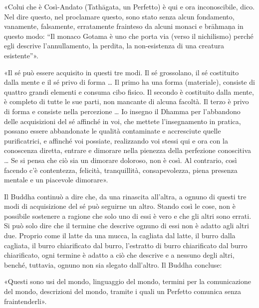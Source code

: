 
\label{pag226}%
«Colui che è Così-Andato (Tathāgata, un Perfetto)
è qui e ora inconoscibile, dico. Nel dire questo, nel proclamare questo, sono
stato senza alcun fondamento, vanamente, falsamente, erratamente frainteso da
alcuni monaci e brāhmaṇa in questo modo: “Il monaco Gotama è uno che porta via
(verso il nichilismo) perché egli descrive l’annullamento, la perdita, la
non-esistenza di una creatura esistente”».


«Il sé può essere acquisito in questi tre modi. Il sé grossolano, il sé
costituito dalla mente e il sé privo di forma … Il primo ha una forma
(materiale), consiste di quattro grandi elementi e consuma cibo fisico. Il
secondo è costituito dalla mente, è completo di tutte le sue parti, non mancante
di alcuna facoltà. Il terzo è privo di forma e consiste nella percezione … Io
insegno il Dhamma per l’abbandono delle acquisizioni del sé affinché in voi, che
mettete l’insegnamento in pratica, possano essere abbandonate le qualità
contaminate e accresciute quelle purificatrici, e affinché voi possiate,
realizzando voi stessi qui e ora con la conoscenza diretta, entrare e dimorare
nella pienezza della perfezione conoscitiva … Se si pensa che ciò sia un
dimorare doloroso, non è così. Al contrario, così facendo c’è contentezza,
felicità, tranquillità, consapevolezza, piena presenza mentale e un piacevole
dimorare».

 Il Buddha continuò a dire che, da una rinascita
all’altra, a ognuno di questi tre modi di acquisizione del sé può seguirne un
altro. Stando così le cose, non è possibile sostenere a ragione che solo uno di
essi è vero e che gli altri sono errati. Si può solo dire che il termine che
descrive ognuno di essi non è adatto agli altri due. Proprio come il latte da
una mucca, la cagliata dal latte, il burro dalla cagliata, il burro chiarificato
dal burro, l’estratto di burro chiarificato dal burro chiarificato, ogni termine
è adatto a ciò che descrive e a nessuno degli altri, benché, tuttavia, ognuno
non sia slegato dall’altro. Il Buddha concluse:

 «Questi sono usi del mondo, linguaggio del mondo, termini
per la comunicazione del mondo, descrizioni del mondo, tramite i quali un
Perfetto comunica senza fraintenderli».



